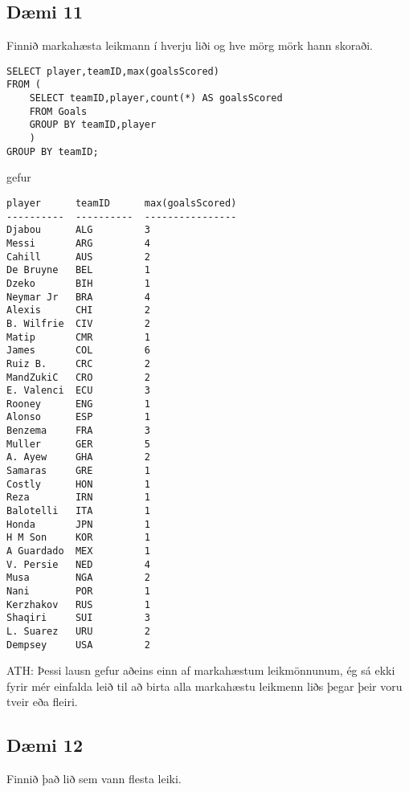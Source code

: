 \subsection*{Dæmi 11}
Finnið markahæsta leikmann í hverju liði og hve mörg mörk hann skoraði.

\lausn
\begin{lstlisting}
SELECT player,teamID,max(goalsScored)
FROM (
	SELECT teamID,player,count(*) AS goalsScored
	FROM Goals
	GROUP BY teamID,player
	)
GROUP BY teamID;
\end{lstlisting}
gefur
\begin{Verbatim}[frame=single]
player      teamID      max(goalsScored)
----------  ----------  ----------------
Djabou      ALG         3
Messi       ARG         4
Cahill      AUS         2
De Bruyne   BEL         1
Dzeko       BIH         1
Neymar Jr   BRA         4
Alexis      CHI         2
B. Wilfrie  CIV         2
Matip       CMR         1
James       COL         6
Ruiz B.     CRC         2
MandZukiC   CRO         2
E. Valenci  ECU         3
Rooney      ENG         1
Alonso      ESP         1
Benzema     FRA         3
Muller      GER         5
A. Ayew     GHA         2
Samaras     GRE         1
Costly      HON         1
Reza        IRN         1
Balotelli   ITA         1
Honda       JPN         1
H M Son     KOR         1
A Guardado  MEX         1
V. Persie   NED         4
Musa        NGA         2
Nani        POR         1
Kerzhakov   RUS         1
Shaqiri     SUI         3
L. Suarez   URU         2
Dempsey     USA         2
\end{Verbatim}
ATH: Þessi lausn gefur aðeins einn af markahæstum leikmönnunum, ég sá ekki fyrir mér einfalda leið til að birta alla markahæstu leikmenn liðs þegar þeir voru tveir eða fleiri.

\subsection*{Dæmi 12}
Finnið það lið sem vann flesta leiki.

